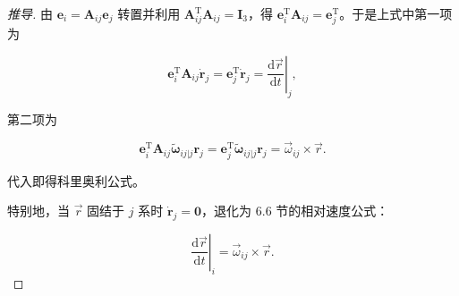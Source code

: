 \begin{proof}[推导]
由 $\boldsymbol{e}_i=\boldsymbol{A}_{ij}\boldsymbol{e}_j$ 转置并利用 $\boldsymbol{A}_{ij}^{\mathrm{T}}\boldsymbol{A}_{ij}=\boldsymbol{I}_3$，得 $\boldsymbol{e}_i^{\mathrm{T}}\boldsymbol{A}_{ij}=\boldsymbol{e}_j^{\mathrm{T}}$。于是上式中第一项为

\[
\boldsymbol{e}_i^{\mathrm{T}}\boldsymbol{A}_{ij}\dot{\boldsymbol{r}}_j=\boldsymbol{e}_j^{\mathrm{T}}\dot{\boldsymbol{r}}_j=\left.\frac{\mathrm{d}\vec{r}}{\mathrm{d}t}\right|_{j},
\]

第二项为

\[
\boldsymbol{e}_i^{\mathrm{T}}\boldsymbol{A}_{ij}\tilde{\boldsymbol{\omega}}_{ij|j}\boldsymbol{r}_j
=\boldsymbol{e}_j^{\mathrm{T}}\tilde{\boldsymbol{\omega}}_{ij|j}\boldsymbol{r}_j=\vec{\omega}_{ij}\times\vec{r}.
\]

代入即得科里奥利公式。

特别地，当 $\vec{r}$ 固结于 $j$ 系时 $\dot{\boldsymbol{r}}_j=\boldsymbol{0}$，退化为 6.6 节的相对速度公式：

\[
\left.\frac{\mathrm{d}\vec{r}}{\mathrm{d}t}\right|_{i}=\vec{\omega}_{ij}\times\vec{r}.
\]
\end{proof}
